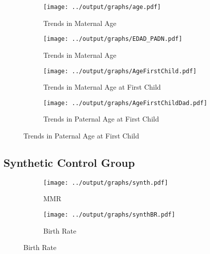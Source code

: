 \documentclass[a4paper, 11pt]{article}
\begin{document}
\begin{appendices}
  
  \begin{figure}[htpb!]
  	\centering	\caption{Trends in Reform and non-Reform Areas}
  	\label{trendsAge}
  	\begin{subfigure}{.5\textwidth}
  		\centering 
  		\texttt{[image: ../output/graphs/age.pdf]}\caption{Trends in Maternal Age}
  		\label{age}
  	\end{subfigure}%
  	\begin{subfigure}{.5\textwidth}
  		\centering 	
  		\texttt{[image: ../output/graphs/EDAD\_PADN.pdf]}
  		\caption{Trends in Maternal Age}
  		\label{agedad}
  	\end{subfigure}
  	\begin{subfigure}{.5\textwidth}
  		\centering 
  		\texttt{[image: ../output/graphs/AgeFirstChild.pdf]}
  		\caption{Trends in Maternal Age at First Child}
  		\label{firstchild_mom}
  	\end{subfigure}%
  	\begin{subfigure}{.5\textwidth}
  		\centering
  		\texttt{[image: ../output/graphs/AgeFirstChildDad.pdf]}
  		\caption{Trends in Paternal Age at First Child}
  		\label{firstchild_dad}
  	\end{subfigure}
  	
  \end{figure}
  
   
   \subsection{Synthetic Control Group}    
   
   \begin{figure}[H] \caption{Synthetic Control Group} \centering
   	
   	\begin{subfigure}{.5\textwidth}
   		\centering 
   		\texttt{[image: ../output/graphs/synth.pdf]}
   		\caption{MMR}
   	
   	\end{subfigure}%
   	\begin{subfigure}{.5\textwidth}
   		\centering
   		\texttt{[image: ../output/graphs/synthBR.pdf]}
   		\caption{Birth Rate}
   		
   	\end{subfigure}
   	
    
   \end{figure} 
   

\end{appendices}
\end{document}
